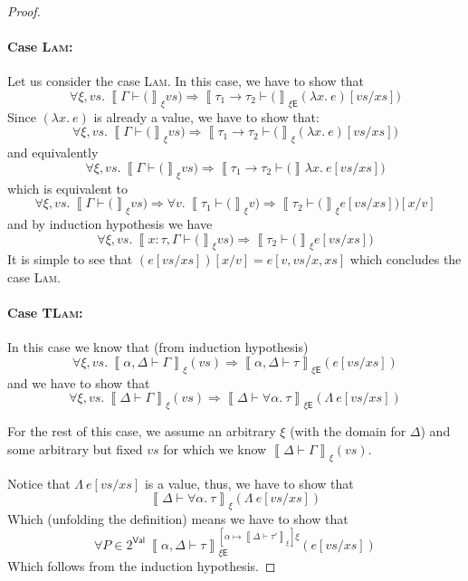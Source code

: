 \documentclass{article}
\newcommand{\EXP}{\mathsf{E}}
\newcommand{\VAL}{\mathsf{Val}}
\newcommand{\semtyp}[3]{\left\llbracket #2 \vdash #3 \right\rrbracket_{#1}}
\newcommand{\semenv}{\xi}
\newcommand{\TLam}{\Lambda}
\newcommand{\Tctx}{\Gamma}
\newcommand{\CtxTps}{\Delta}
\newcommand{\expr}{e}
\newcommand{\val}{v}
\newcommand{\var}{x}
\newcommand{\typ}{\tau}
\newcommand{\tvar}{\alpha}
\begin{document}
\begin{proof}
\paragraph{Case \textsc{Lam}:}
Let us consider the case \textsc{Lam}. In this case, we have to show that
\[
\forall \semenv, \mathit{vs}. ~\semtyp{\semenv}{\Tctx}(\mathit{vs}) \Rightarrow
\semtyp{\semenv\EXP}{\typ_1 \to \typ_2}((\lambda \var.~\expr)[\mathit{vs}/\mathit{xs}])
\]
Since $(\lambda \var.~\expr)$ is already a value, we have to show that:
\[
\forall \semenv, \mathit{vs}. ~\semtyp{\semenv}{\Tctx}(\mathit{vs}) \Rightarrow
\semtyp{\semenv}{\typ_1 \to \typ_2}((\lambda \var.~\expr)[\mathit{vs}/\mathit{xs}])
\]
and equivalently
\[
\forall \semenv, \mathit{vs}. ~\semtyp{\semenv}{\Tctx}(\mathit{vs}) \Rightarrow
\semtyp{}{\typ_1 \to \typ_2}(\lambda \var.~\expr[\mathit{vs}/\mathit{xs}])
\]
which is equivalent to 
\[
\forall \semenv, \mathit{vs}. ~\semtyp{\semenv}{\Tctx}(\mathit{vs}) \Rightarrow
\forall \val.~\semtyp{\semenv}{\typ_1}(\val) \Rightarrow \semtyp{\semenv}{\typ_2}(\expr[\mathit{vs}/\mathit{xs}])[\var/\val]
\]
and by induction hypothesis we have
\[
\forall \semenv, \mathit{vs}. ~\semtyp{\semenv}{\var : \typ, \Tctx}(\mathit{vs}) \Rightarrow
\semtyp{\semenv}{\typ_2}(\expr[\mathit{vs}/\mathit{xs}])
\]
It is simple to see that $(e[\mathit{vs}/\mathit{xs}])[\var/\val] = \expr[\val, \mathit{vs}/\var, \mathit{xs}]$
which concludes the case \textsc{Lam}.

\paragraph{Case \textsc{TLam}:}
In this case we know that (from induction hypothesis)
\[
\forall \semenv, \mathit{vs}.~\semtyp{\semenv}{\tvar, \CtxTps}{\Tctx}(\mathit{vs}) \Rightarrow \semtyp{\semenv\EXP}
{\tvar, \CtxTps}{\typ}(\expr[\mathit{vs}/\mathit{xs}])
\]
and we have to show that
\[
\forall \semenv, \mathit{vs}.~\semtyp{\semenv}{\CtxTps}{\Tctx}(\mathit{vs}) \Rightarrow \semtyp{\semenv\EXP}
{\CtxTps}{\forall \tvar.~\typ}(\TLam~\expr[\mathit{vs}/\mathit{xs}])
\]

For the rest of this case, we assume an arbitrary $\semenv$ (with the domain for $\CtxTps$) and
some arbitrary but fixed $\mathit{vs}$ for which we know
$\semtyp{\semenv}{\CtxTps}{\Tctx}(\mathit{vs})$.

Notice that $\TLam~\expr[\mathit{vs}/\mathit{xs}]$ is a value,
thus, we have to show that
\[
\semtyp{\semenv}{\CtxTps}{\forall \tvar.~\typ}(\TLam~\expr[\mathit{vs}/\mathit{xs}])
\]
Which (unfolding the definition) means we have to show that
\[
\forall P \in 2^{\VAL}~\semtyp{\semenv\EXP}{\tvar, \CtxTps}{\typ}
^{[\tvar \mapsto  \semtyp{\semenv}{\CtxTps}{\typ'}]\semenv}(e[\mathit{vs}/\mathit{xs}])
\]
Which follows from the induction hypothesis.
\end{proof}
\end{document}
